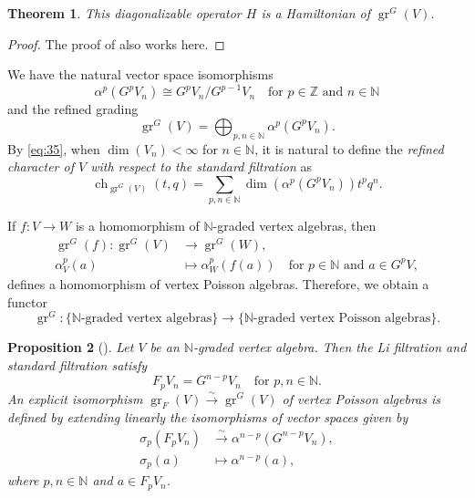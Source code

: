 \documentclass[a4paper, 12pt, reqno]{amsart}
\newtheorem{theorem}{Theorem}[section]
\newtheorem{proposition}[theorem]{Proposition}
\theoremstyle{remark}
\numberwithin{equation}{subsection}
\DeclareMathOperator{\gr}{gr}
\DeclareMathOperator{\ch}{ch}
\begin{document}
\begin{theorem}
  \label{thr:47}
  This diagonalizable operator $H$ is a Hamiltonian of $\gr^G(V)$.
\end{theorem}

\begin{proof}
  The proof of  also works here.
\end{proof}

We have the natural vector space isomorphisms
\begin{equation*}
  \alpha^p(G^pV_n) \cong G^pV_n/G^{p - 1}V_n \quad \text{for }p \in \mathbb{Z}\text{ and }n \in \mathbb{N}
\end{equation*}
and the refined grading
\begin{equation}
  \label{eq:35}
  \gr^G(V) =\bigoplus_{p, n \in \mathbb{N}}\alpha^p(G^pV_n).
\end{equation}
By \eqref{eq:35}, when $\dim(V_n) < \infty$ for $n \in \mathbb{N}$, it is natural to define the \emph{refined character of $V$ with respect to the standard filtration} as
\begin{equation*}
  \ch_{\gr^G(V)}(t, q) = \sum_{p, n \in \mathbb{N}}\dim(\alpha^p(G^pV_n))t^pq^n.
\end{equation*}

If $f: V \to W$ is a homomorphism of $\mathbb{N}$-graded vertex algebras, then
\begin{align*}
  \gr^G(f): \gr^G(V) &\to \gr^G(W), \\
  \alpha_V^p(a) &\mapsto \alpha_W^p(f(a)) \quad \text{for }p \in \mathbb{N}\text{ and }a \in G^pV,
\end{align*}
defines a homomorphism of vertex Poisson algebras.
Therefore, we obtain a functor
\begin{equation*}
  \gr^G: \{\text{$\mathbb{N}$-graded vertex algebras}\} \to \{\text{$\mathbb{N}$-graded vertex Poisson algebras}\}.
\end{equation*}

\begin{proposition}[{\cite[Proposition 2.6.1]{arakawa_remark_2012}}]
  \label{prp:12}
  Let $V$ be an $\mathbb{N}$-graded vertex algebra.
  Then the Li filtration and standard filtration satisfy
  \begin{equation*}
    F_pV_n = G^{n - p}V_n \quad \text{for }p, n \in \mathbb{N}.
  \end{equation*}
  An explicit isomorphism $\gr_F(V) \xrightarrow{\sim} \gr^G(V)$ of vertex Poisson algebras is defined by extending linearly the isomorphisms of vector spaces given by
  \begin{align*}
    \sigma_p(F_pV_n) &\xrightarrow{\sim} \alpha^{n - p}(G^{n - p}V_n), \\
    \sigma_p(a) &\mapsto \alpha^{n - p}(a),
  \end{align*}
  where $p, n \in \mathbb{N}$ and $a \in F_pV_n$.
\end{proposition}
\end{document}
